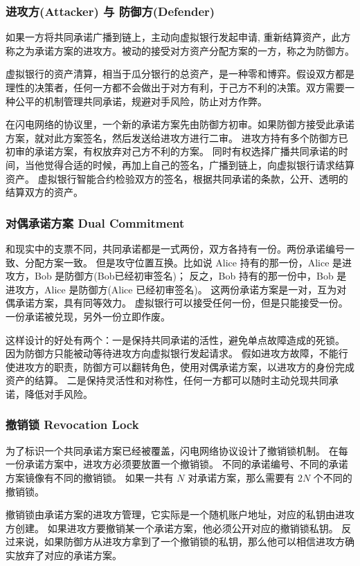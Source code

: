 \subsubsection{进攻方(Attacker) 与 防御方(Defender)}
如果一方将共同承诺广播到链上，主动向虚拟银行发起申请, 重新结算资产，此方称之为承诺方案的进攻方。被动的接受对方资产分配方案的一方，称之为防御方。

虚拟银行的资产清算，相当于瓜分银行的总资产，是一种零和博弈。假设双方都是理性的决策者，任何一方都不会做出于对方有利，于己方不利的决策。双方需要一种公平的机制管理共同承诺，规避对手风险，防止对方作弊。

在闪电网络的协议里，一个新的承诺方案先由防御方初审。如果防御方接受此承诺方案，就对此方案签名，然后发送给进攻方进行二审。
进攻方持有多个防御方已初审的承诺方案，有权放弃对己方不利的方案。
同时有权选择广播共同承诺的时间，当他觉得合适的时候，再加上自己的签名，广播到链上，向虚拟银行请求结算资产。
虚拟银行智能合约检验双方的签名，根据共同承诺的条款，公开、透明的结算双方的资产。

\subsubsection{对偶承诺方案 Dual Commitment}
和现实中的支票不同，共同承诺都是一式两份，双方各持有一份。两份承诺编号一致、分配方案一致。
但是攻守位置互换。比如说 Alice 持有的那一份，Alice 是进攻方，Bob 是防御方(Bob已经初审签名)；
反之，Bob 持有的那一份中，Bob 是进攻方，Alice 是防御方(Alice 已经初审签名)。
这两份承诺方案是一对，互为对偶承诺方案，具有同等效力。
虚拟银行可以接受任何一份，但是只能接受一份。
一份承诺被兑现，另外一份立即作废。

这样设计的好处有两个：一是保持共同承诺的活性，避免单点故障造成的死锁。
因为防御方只能被动等待进攻方向虚拟银行发起请求。
假如进攻方故障，不能行使进攻方的职责，防御方可以翻转角色，使用对偶承诺方案，以进攻方的身份完成资产的结算。
二是保持灵活性和对称性，任何一方都可以随时主动兑现共同承诺，降低对手风险。

\subsubsection{撤销锁 Revocation Lock}
为了标识一个共同承诺方案已经被覆盖，闪电网络协议设计了撤销锁机制。
在每一份承诺方案中，进攻方必须要放置一个撤销锁。
不同的承诺编号、不同的承诺方案镜像有不同的撤销锁。
如果一共有 $N$ 对承诺方案，那么需要有 $2N$ 个不同的撤销锁。

撤销锁由承诺方案的进攻方管理，它实际是一个随机账户地址，对应的私钥由进攻方创建。
如果进攻方要撤销某一个承诺方案，他必须公开对应的撤销锁私钥。
反过来说，如果防御方从进攻方拿到了一个撤销锁的私钥，那么他可以相信进攻方确实放弃了对应的承诺方案。 


